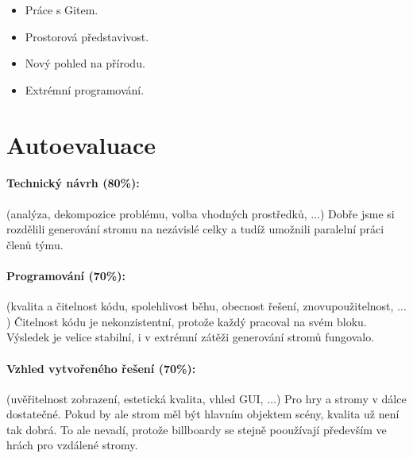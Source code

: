 \documentclass[11pt,a4paper]{article}
\begin{document}
%

\begin{itemize}
\item Práce s Gitem.
\item Prostorová představivost.
\item Nový pohled na přírodu.
\item Extrémní programování.
\end{itemize}

\section{Autoevaluace}


\paragraph{Technický návrh (80\%):} (analýza, dekompozice problému, volba
vhodných prostředků, $\ldots$) 
Dobře jsme si rozdělili generování stromu na nezávislé celky a tudíž umožnili paralelní práci členů týmu.

\paragraph{Programování (70\%):} (kvalita a čitelnost kódu, spolehlivost běhu,
obecnost řešení, znovupoužitelnost, $\ldots$)
Čitelnost kódu je nekonzistentní, protože každý pracoval na svém bloku. Výsledek je velice stabilní, i v extrémní zátěži generování stromů fungovalo.

\paragraph{Vzhled vytvořeného řešení (70\%):} (uvěřitelnost zobrazení,
estetická kvalita, vhled GUI, $\ldots$)
Pro hry a stromy v dálce dostatečné. Pokud by ale strom měl být hlavním objektem scény, kvalita už není tak dobrá. To ale nevadí, protože billboardy se stejně pooužívají především ve hrách pro vzdálené stromy.
\end{document}
